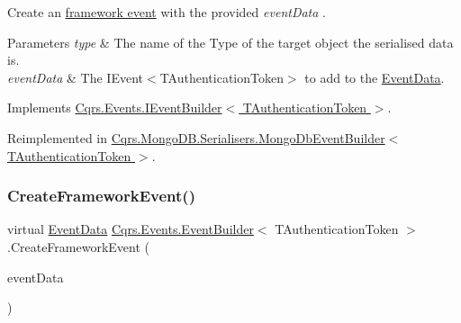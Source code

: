 Create an \hyperlink{}{framework event} with the provided {\itshape event\+Data} . 


\begin{DoxyParams}{Parameters}
{\em type} & The name of the Type of the target object the serialised data is.\\
\hline
{\em event\+Data} & The I\+Event$<$\+T\+Authentication\+Token$>$ to add to the \hyperlink{classCqrs_1_1Events_1_1EventData}{Event\+Data}.\\
\hline
\end{DoxyParams}


Implements \hyperlink{interfaceCqrs_1_1Events_1_1IEventBuilder_ac77123302de4e79df9661c13219af4d4_ac77123302de4e79df9661c13219af4d4}{Cqrs.\+Events.\+I\+Event\+Builder$<$ T\+Authentication\+Token $>$}.



Reimplemented in \hyperlink{classCqrs_1_1MongoDB_1_1Serialisers_1_1MongoDbEventBuilder_a06afbb994fd3f679f275dea3d1d60c6e_a06afbb994fd3f679f275dea3d1d60c6e}{Cqrs.\+Mongo\+D\+B.\+Serialisers.\+Mongo\+Db\+Event\+Builder$<$ T\+Authentication\+Token $>$}.

\mbox{\label{classCqrs_1_1Events_1_1EventBuilder_abcc2515f98e4852ab656f1868e7a344c_abcc2515f98e4852ab656f1868e7a344c}} 
\subsubsection{\texorpdfstring{Create\+Framework\+Event()}{CreateFrameworkEvent()}\hspace{0.1cm}{\footnotesize\ttfamily [2/2]}}
{\footnotesize\ttfamily virtual \hyperlink{classCqrs_1_1Events_1_1EventData}{Event\+Data} \hyperlink{classCqrs_1_1Events_1_1EventBuilder}{Cqrs.\+Events.\+Event\+Builder}$<$ T\+Authentication\+Token $>$.Create\+Framework\+Event (\begin{DoxyParamCaption}\item[{\hyperlink{interfaceCqrs_1_1Events_1_1IEvent}{I\+Event}$<$ T\+Authentication\+Token $>$}]{event\+Data }\end{DoxyParamCaption})\hspace{0.3cm}{\ttfamily [virtual]}}



